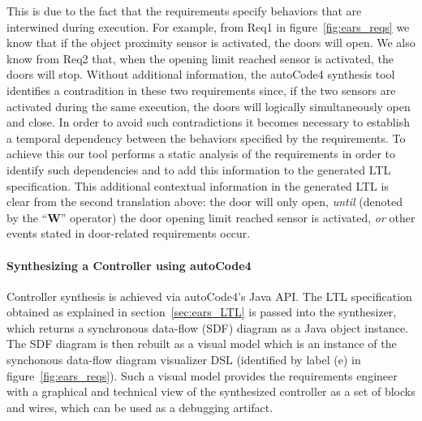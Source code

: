 This is due to the fact that the requirements specify behaviors that are
interwined during execution. For example, from \textsf{Req1}  in
figure~\ref{fig:ears_reqs} we know that if the \textsf{object proximity sensor}
is activated, the doors will open. We also know from \textsf{Req2} that, when
the \textsf{opening limit reached} sensor is activated, the doors will stop.
Without additional information, the \textsf{autoCode4} synthesis tool identifies
a contradition in these two requirements since, if the two sensors are activated
during the same execution, the doors will logically simultaneously open and
close. In order to avoid such contradictions it becomes necessary to establish a
temporal dependency between the behaviors specified by the requirements. To
achieve this our tool performs a static analysis of the requirements in order to
identify such dependencies and to add this information to the generated LTL
specification. This additional contextual information in the generated LTL is
clear from the second translation above:
the door will only open, \emph{until} (denoted by the ``\textbf{W}'' operator)
the door \textsf{opening limit reached} sensor is activated, \emph{or} other events
stated in door-related requirements occur.\\ 
\paragraph{\textbf{Synthesizing a Controller using \textsf{autoCode4}}}
Controller synthesis is achieved via \textsf{autoCode4}'s Java
API. The LTL specification obtained as explained in section~\ref{sec:ears_LTL}
is passed into the synthesizer, which returns a synchronous data-flow (SDF)
diagram as a Java object instance. The SDF diagram is then rebuilt as a visual model
which is an instance of the synchonous data-flow diagram visualizer DSL
(identified by label (\textsf{e}) in figure~\ref{fig:ears_reqs}). Such a visual
model provides the requirements engineer with a graphical and technical view of
the synthesized controller as a set of blocks and wires, which can be used as a
debugging artifact.\\
